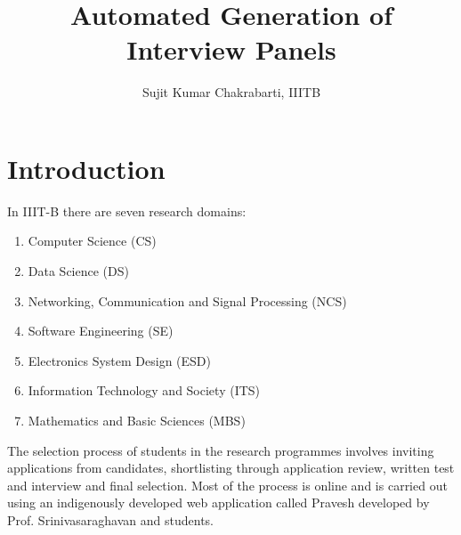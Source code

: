 \documentclass[12pt,a4paper]{article}
\author{Sujit Kumar Chakrabarti, IIITB }
\title{Automated Generation of Interview Panels}
\date{}
\begin{document}

\newcommand{\highlight}[1]{{\color{Red}(#1)}}
\newcommand{\comment}[1]{{\color{Blue}#1}}

\newtheorem{theorem}{Theorem}
\newtheorem{definition}{Definition}
\newtheorem{example}{Example}
\newtheorem{myrule}{Rule}



\maketitle
{}

\section{Introduction}
In IIIT-B there are seven research domains:
\begin{enumerate}
\item Computer Science (CS)
\item Data Science (DS)
\item Networking, Communication and Signal Processing (NCS)
\item Software Engineering (SE)
\item Electronics System Design (ESD)
\item Information Technology and Society (ITS)
\item Mathematics and Basic Sciences (MBS)
\end{enumerate}

The selection process of students in the research programmes involves inviting applications from candidates, shortlisting through application review, written test and interview and final selection. Most of the process is online and is carried out using an indigenously developed web application called Pravesh developed by Prof. Srinivasaraghavan and students.
\end{document}
